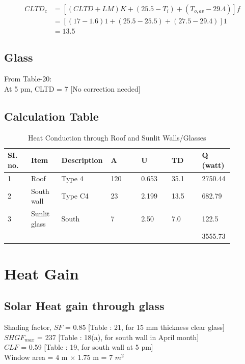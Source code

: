 \documentclass{article}
\begin{document}
    \begin{align*}
      CLTD_c &= \left[(CLTD + LM)K + (25.5 - T_i) + (T_{o,av} - 29.4)\right] f \\
      &= \left[(17 - 1.6)1 + (25.5 - 25.5) + (27.5 - 29.4)\right] 1 \\
      &= 13.5
    \end{align*}

    \subsection{Glass}
    From Table-20: \\
    At 5 pm, CLTD = 7  [No correction needed]\\

    \subsection{Calculation Table}
    \begin{table}[ht]
      \centering
      \begin{tabularx}{\linewidth}{p{0.10\linewidth} p{0.13\linewidth} p{0.13\linewidth} p{0.13\linewidth} p{0.13\linewidth} p{0.13\linewidth} p{0.13\linewidth}}
          \hline
          SI. no. & Item & Description & A & U & TD & Q (watt) \\
          \hline
          1 & Roof & Type 4 & 120 & 0.653 & 35.1 & 2750.44 \\
          2 & South wall & Type C4 & 23 & 2.199 & 13.5 & 682.79 \\
          3 & Sunlit glass & South & 7 & 2.50 & 7.0 & 122.5 \\
          \hline
          &&&&&& 3555.73 \\
          \hline
      \end{tabularx}
      \caption{Heat Conduction through Roof and Sunlit Walls/Glasses}
      \label{tab:Heat-Conduction-Roof-Sunlit-Walls-Glasses}
    \end{table}
    \vspace*{1cm}

    \section{Heat Gain}
    \subsection{Solar Heat gain through glass}
    Shading factor, $SF$ = 0.85 [Table : 21, for 15 mm thickness clear glass] \\
    $SHGF_{max}$ = 237 [Table : 18(a), for south wall in April month] \\
    $CLF$ = 0.59 [Table : 19, for south wall at 5 pm] \\ 
    Window area = 4 m $\times$ 1.75 m = 7 $m^2$ \\
\end{document}

